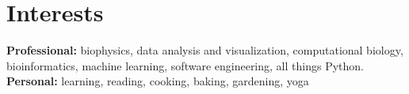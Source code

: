 \section{Interests}

\textbf{Professional:} biophysics, data analysis and visualization, computational biology, bioinformatics, machine learning, software engineering, all things Python.
\textbf{Personal:} learning, reading, cooking, baking, gardening, yoga
